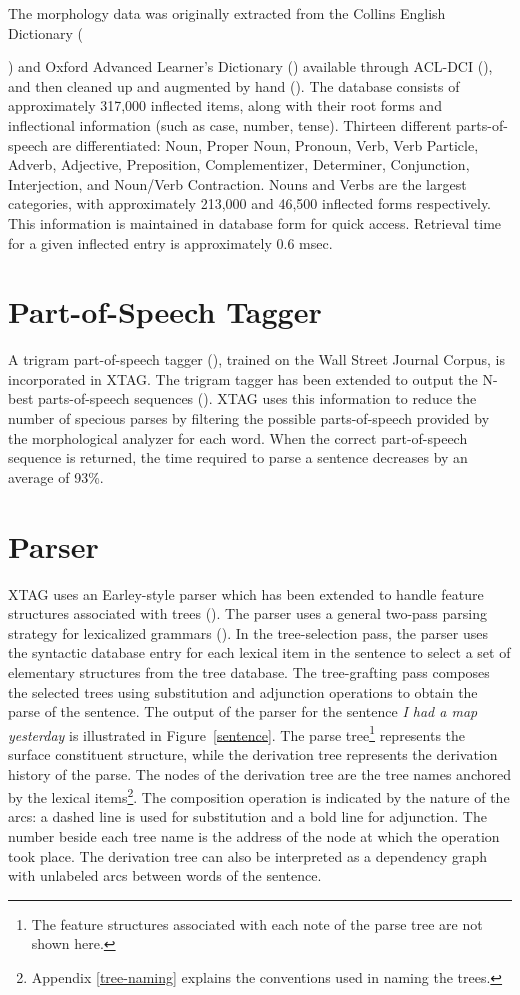 The morphology data was originally extracted from the Collins English
Dictionary ({\cite{ced79}) and Oxford Advanced Learner's Dictionary
(\cite{oald74}) available through ACL-DCI (\cite{liberman89}), and then cleaned
up and augmented by hand (\cite{karp92}).  The database consists of
approximately 317,000 inflected items, along with their root forms and
inflectional information (such as case, number, tense).  Thirteen different
parts-of-speech are differentiated: Noun, Proper Noun, Pronoun, Verb, Verb
Particle, Adverb, Adjective, Preposition, Complementizer, Determiner,
Conjunction, Interjection, and Noun/Verb Contraction.  Nouns and Verbs are the
largest categories, with approximately 213,000 and 46,500 inflected forms
respectively.  This information is maintained in database form for quick
access.  Retrieval time for a given inflected entry is approximately 0.6 msec.

\section{Part-of-Speech Tagger}

A trigram part-of-speech tagger (\cite{kwc88}), trained on the Wall Street
Journal Corpus, is incorporated in XTAG. The trigram tagger has been extended
to output the N-best parts-of-speech sequences (\cite{soong90}).  XTAG uses
this information to reduce the number of specious parses by filtering the
possible parts-of-speech provided by the morphological analyzer for each word.
When the correct part-of-speech sequence is returned, the time required to
parse a sentence decreases by an average of 93\%.

\section{Parser}

XTAG uses an Earley-style parser which has been extended to handle
feature structures associated with trees (\cite{schabes90}). The parser uses a
general two-pass parsing strategy for lexicalized grammars (\cite{schabes88}).
In the tree-selection pass, the parser uses the syntactic database entry for
each lexical item in the sentence to select a set of elementary structures from
the tree database.  The tree-grafting pass composes the selected trees using
substitution and adjunction operations to obtain the parse of the sentence.
The output of the parser for the sentence {\it I had a map yesterday} is
illustrated in Figure~\ref{sentence}. The parse tree\footnote{The feature
structures associated with each note of the parse tree are not shown here.}
represents the surface constituent structure, while the derivation tree
represents the derivation history of the parse. The nodes of the derivation
tree are the tree names anchored by the lexical items\footnote{Appendix
\ref{tree-naming} explains the conventions used in naming the trees.}.  The
composition operation is indicated by the nature of the arcs: a dashed line is
used for substitution and a bold line for adjunction.  The number beside each
tree name is the address of the node at which the operation took place.  The
derivation tree can also be interpreted as a dependency graph with unlabeled
arcs between words of the sentence.

}
